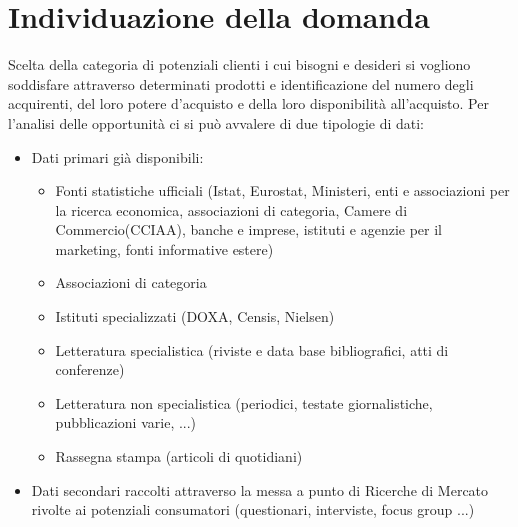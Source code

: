 \section{Individuazione della domanda}
Scelta della categoria di potenziali clienti i cui bisogni e desideri si vogliono soddisfare attraverso determinati prodotti e identificazione del numero degli acquirenti, del loro potere d’acquisto e della loro disponibilità all'acquisto. \newline
Per l’analisi delle opportunità ci si può avvalere di due tipologie di dati:
\begin{itemize}
	\item Dati primari già disponibili:
	\begin{itemize}
		\item Fonti statistiche ufficiali (Istat, Eurostat, Ministeri, enti e associazioni per la ricerca economica, associazioni di categoria, Camere di Commercio(CCIAA), banche e imprese, istituti e agenzie per il marketing, fonti informative estere)
		\item Associazioni di categoria
		\item Istituti specializzati (DOXA, Censis, Nielsen)
		\item Letteratura specialistica (riviste e data base bibliografici, atti di conferenze)
		\item Letteratura non specialistica (periodici, testate giornalistiche, pubblicazioni varie, ...)
		\item Rassegna stampa (articoli di quotidiani)
	\end{itemize}
	\item Dati secondari raccolti attraverso la messa a punto di Ricerche di Mercato rivolte ai potenziali consumatori (questionari, interviste, focus group ...)
\end{itemize}

